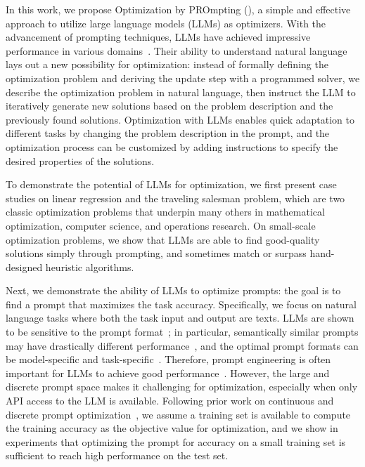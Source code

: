 In this work, we propose Optimization by PROmpting (\name{}), a simple and effective approach to utilize large language models (LLMs) as optimizers.
With the advancement of prompting techniques, LLMs have achieved impressive performance in various domains~\citep{wei2022chain,kojima2022large,wang2022self,zhou2022least,madaan2023self,bai2022constitutional,chen2023teaching}.
Their ability to understand natural language lays out a new possibility for optimization: instead of formally defining the optimization problem and deriving the update step with a programmed solver, we describe the optimization problem in natural language, then instruct the LLM to iteratively generate new solutions based on the problem description and the previously found solutions.
Optimization with LLMs enables quick adaptation to different tasks by changing the problem description in the prompt, and the optimization process can be customized by adding instructions to specify the desired properties of the solutions.

To demonstrate the potential of LLMs for optimization, we first present case studies on linear regression and the traveling salesman problem, which are two classic optimization problems that underpin many others in mathematical optimization, computer science, and operations research.
On small-scale optimization problems, we show that LLMs are able to find good-quality solutions simply through prompting, and sometimes match or surpass hand-designed heuristic algorithms.

Next, we demonstrate the ability of LLMs to optimize prompts: the goal is to find a prompt that maximizes the task accuracy. 
Specifically, we focus on natural language tasks where both the task input and output are texts. 
LLMs are shown to be sensitive to the prompt format~\citep{zhao2021calibrate,lu2021fantastically,wei2023larger,madaan2022text}; in particular, semantically similar prompts may have drastically different performance~\citep{kojima2022large,zhou2022large,zhang2022tempera}, and the optimal prompt formats can be model-specific and task-specific~\citep{ma2023let,chen2023you}.
Therefore, prompt engineering is often important for LLMs to achieve good performance~\citep{reynolds2021prompt}.
However, the large and discrete prompt space makes it challenging for optimization, especially when only API access to the LLM is available. 
Following prior work on continuous and discrete prompt optimization~\citep{lester2021power,li2021prefix,zhou2022large,pryzant2023automatic}, we assume a training set is available to compute the training accuracy as the objective value for optimization, and we show in experiments that optimizing the prompt for accuracy on a small training set is sufficient to reach high performance on the test set.


